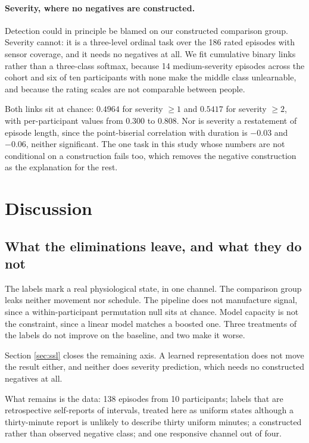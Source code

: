 \documentclass{article}
\begin{document}
\paragraph{Severity, where no negatives are constructed.} Detection could in
principle be blamed on our constructed comparison group. Severity cannot: it is
a three-level ordinal task over the 186 rated episodes with sensor coverage,
and it needs no negatives at all. We fit cumulative binary links rather than a
three-class softmax, because 14 medium-severity episodes across the cohort and
six of ten participants with none make the middle class unlearnable, and
because the rating scales are not comparable between people.

Both links sit at chance: $0.4964$ for severity $\geq 1$ and $0.5417$ for
severity $\geq 2$, with per-participant values from $0.300$ to $0.808$. Nor is
severity a restatement of episode length, since the point-biserial correlation
with duration is $-0.03$ and $-0.06$, neither significant. The one task in this
study whose numbers are not conditional on a construction fails too, which
removes the negative construction as the explanation for the rest.

\section{Discussion}

\subsection{What the eliminations leave, and what they do not}

The labels mark a real physiological state, in one channel. The comparison
group leaks neither movement nor schedule. The pipeline does not manufacture
signal, since a within-participant permutation null sits at chance. Model
capacity is not the constraint, since a linear model matches a boosted one.
Three treatments of the labels do not improve on the baseline, and two make it
worse.

Section \ref{sec:ssl} closes the remaining axis. A learned representation does
not move the result either, and neither does severity prediction, which needs
no constructed negatives at all.

What remains is the data: 138 episodes from 10 participants; labels that are
retrospective self-reports of intervals, treated here as uniform states
although a thirty-minute report is unlikely to describe thirty uniform
minutes; a constructed rather than observed negative class; and one responsive
channel out of four.
\end{document}

